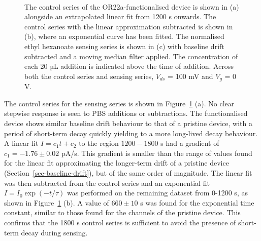 \documentclass[
  a4paper,
]{scrbook}
\begin{document}
\begin{figure}
\begin{minipage}[t]{0.70\linewidth}
{{}

}

\end{minipage}%
%
\begin{minipage}[t]{0.15\linewidth}

{\centering 

~

}

\end{minipage}%

\caption[The control series of the successfully OR22a-functionalised
device alongside a linear fitted curve, as well as the control series
with the linear approximation subtracted with an exponential fitted
curve, and the filtered sensing series with baseline drift
subtracted.]{\label{fig-OR22a-series}The control series of the
OR22a-functionalised device is shown in (a) alongside an extrapolated
linear fit from 1200 s onwards. The control series with the linear
approximation subtracted is shown in (b), where an exponential curve has
been fitted. The normalised ethyl hexanoate sensing series is shown in
(c) with baseline drift subtracted and a moving median filter applied.
The concentration of each 20 µL addition is indicated above the time of
addition. Across both the control series and sensing series, \(V_{ds}\)
= 100 mV and \(V_g\) = 0 V.}

\end{figure}

The control series for the sensing series is shown in
Figure~\ref{fig-OR22a-series} (a). No clear stepwise response is seen to
PBS additions or subtractions. The functionalised device shows similar
baseline drift behaviour to that of a pristine device, with a period of
short-term decay quickly yielding to a more long-lived decay behaviour.
A linear fit \(I = c_1t + c_2\) to the region \(1200-1800\) s had a
gradient of \(c_1 = -1.76\pm0.02\) pA/s. This gradient is smaller than
the range of values found for the linear fit approximating the
longer-term drift of a pristine device
(Section~\ref{sec-baseline-drift}), but of the same order of magnitude.
The linear fit was then subtracted from the control series and an
exponential fit \(I = I_0\exp(-t/\tau)\) was performed on the remaining
dataset from 0-1200 s, as shown in Figure~\ref{fig-OR22a-series} (b). A
value of \(660 \pm 10\) s was found for the exponential time constant,
similar to those found for the channels of the pristine device. This
confirms that the 1800 s control series is sufficient to avoid the
presence of short-term decay during sensing.
\end{document}
